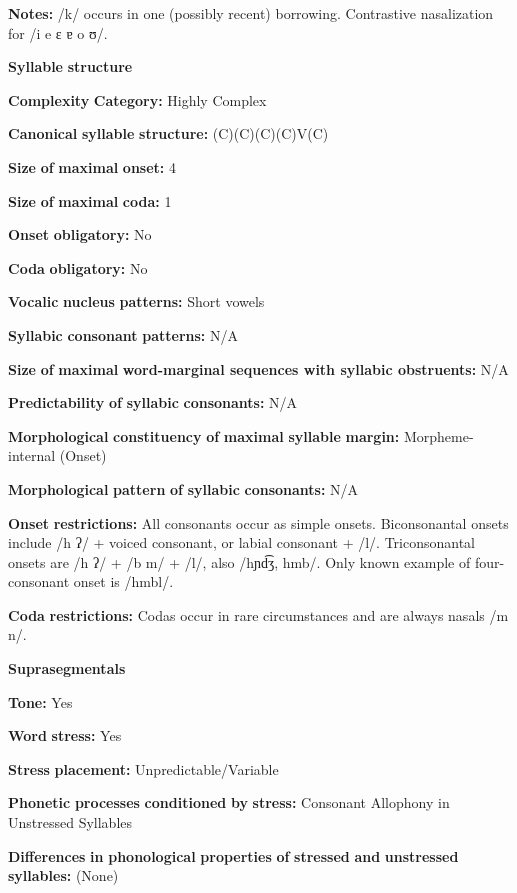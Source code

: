 \textbf{Notes:} /k/ occurs in one (possibly recent) borrowing. Contrastive nasalization for /i e ɛ ɐ o ʊ/.

\textbf{Syllable} \textbf{structure}

\textbf{Complexity} \textbf{Category:} Highly Complex

\textbf{Canonical} \textbf{syllable} \textbf{structure:} (C)(C)(C)(C)V(C) \citep[68-76]{Marmion2010}

\textbf{Size} \textbf{of} \textbf{maximal} \textbf{onset:} 4

\textbf{Size} \textbf{of} \textbf{maximal} \textbf{coda:} 1

\textbf{Onset} \textbf{obligatory:} No

\textbf{Coda} \textbf{obligatory:} No

\textbf{Vocalic} \textbf{nucleus} \textbf{patterns:} Short vowels

\textbf{Syllabic} \textbf{consonant} \textbf{patterns:} N/A

\textbf{Size} \textbf{of} \textbf{maximal} \textbf{word{}-marginal sequences with syllabic obstruents:} N/A

\textbf{Predictability} \textbf{of} \textbf{syllabic} \textbf{consonants:} N/A

\textbf{Morphological} \textbf{constituency} \textbf{of} \textbf{maximal} \textbf{syllable} \textbf{margin:} Morpheme-internal (Onset)

\textbf{Morphological} \textbf{pattern} \textbf{of} \textbf{syllabic} \textbf{consonants:} N/A

\textbf{Onset} \textbf{restrictions:} All consonants occur as simple onsets. Biconsonantal onsets include /h ʔ/ + voiced consonant, or labial consonant + /l/. Triconsonantal onsets are /h ʔ/ + /b m/ + /l/, also /hɲd͡ʒ, hmb/. Only known example of four-consonant onset is /hmbl/.

\textbf{Coda} \textbf{restrictions:} Codas occur in rare circumstances and are always nasals /m n/.

\textbf{Suprasegmentals}

\textbf{Tone:} Yes

\textbf{Word} \textbf{stress:} Yes

\textbf{Stress} \textbf{placement:} Unpredictable/Variable

\textbf{Phonetic} \textbf{processes} \textbf{conditioned} \textbf{by} \textbf{stress:} Consonant Allophony in Unstressed Syllables

\textbf{Differences} \textbf{in} \textbf{phonological} \textbf{properties} \textbf{of} \textbf{stressed} \textbf{and} \textbf{unstressed} \textbf{syllables:} (None)

